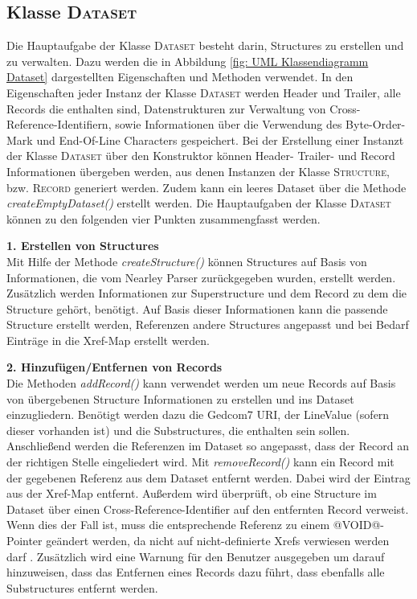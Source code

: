 \subsection{Klasse \textsc{Dataset}}
\label{subsec: Implementierung - Gedcom Struktur - Klasse Dataset}
Die Hauptaufgabe der Klasse \textsc{Dataset} besteht darin, Structures zu erstellen und zu verwalten. Dazu werden die in Abbildung \ref{fig: UML Klassendiagramm Dataset} dargestellten Eigenschaften und Methoden verwendet. In den Eigenschaften jeder Instanz der Klasse \textsc{Dataset} werden Header und Trailer, alle Records die enthalten sind, Datenstrukturen zur Verwaltung von Cross-Reference-Identifiern, sowie Informationen über die Verwendung des Byte-Order-Mark und End-Of-Line Characters gespeichert. Bei der Erstellung einer Instanzt der Klasse \textsc{Dataset} über den Konstruktor können Header- Trailer- und Record Informationen übergeben werden, aus denen Instanzen der Klasse \textsc{Structure}, bzw. \textsc{Record} generiert werden. Zudem kann ein leeres Dataset über die Methode \textit{createEmptyDataset()} erstellt werden. Die Hauptaufgaben der Klasse \textsc{Dataset} können zu den folgenden vier Punkten zusammengfasst werden.

\vspace{1em}
\textbf{1. Erstellen von Structures} \vspace{0.5em} \\
Mit Hilfe der Methode \textit{createStructure()} können Structures auf Basis von Informationen, die vom Nearley Parser zurückgegeben wurden, erstellt werden. Zusätzlich werden Informationen zur Superstructure und dem Record zu dem die Structure gehört, benötigt. Auf Basis dieser Informationen kann die passende Structure erstellt werden, Referenzen andere Structures angepasst und bei Bedarf Einträge in die Xref-Map erstellt werden. 

\vspace{1em}
\textbf{2. Hinzufügen/Entfernen von Records} \vspace{0.5em} \\
Die Methoden \textit{addRecord()} kann verwendet werden um neue Records auf Basis von übergebenen Structure Informationen zu erstellen und ins Dataset einzugliedern. Benötigt werden dazu die Gedcom7 URI, der LineValue (sofern dieser vorhanden ist) und die Substructures, die enthalten sein sollen. Anschließend werden die Referenzen im Dataset so angepasst, dass der Record an der richtigen Stelle eingeliedert wird. Mit \textit{removeRecord()} kann ein Record mit der gegebenen Referenz aus dem Dataset entfernt werden. Dabei wird der Eintrag aus der Xref-Map entfernt. Außerdem wird überprüft, ob eine Structure im Dataset über einen Cross-Reference-Identifier auf den entfernten Record verweist. Wenn dies der Fall ist, muss die entsprechende Referenz zu einem @VOID@-Pointer geändert werden, da nicht auf nicht-definierte Xrefs verwiesen werden darf \cite{GEDCOM}. Zusätzlich wird eine Warnung für den Benutzer ausgegeben um darauf hinzuweisen, dass das Entfernen eines Records dazu führt, dass ebenfalls alle Substructures entfernt werden. 


